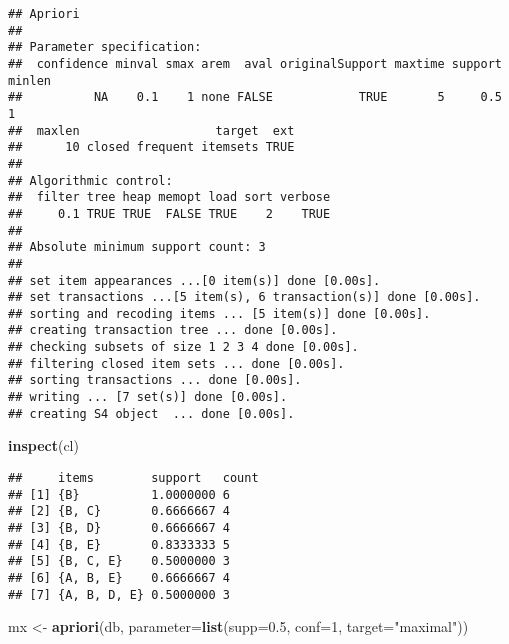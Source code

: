 \documentclass[
]{article}
\newenvironment{Shaded}{\begin{snugshade}}{\end{snugshade}}
\newcommand{\AttributeTok}[1]{\textcolor[rgb]{0.13,0.29,0.53}{#1}}
\newcommand{\DecValTok}[1]{\textcolor[rgb]{0.00,0.00,0.81}{#1}}
\newcommand{\FloatTok}[1]{\textcolor[rgb]{0.00,0.00,0.81}{#1}}
\newcommand{\FunctionTok}[1]{\textcolor[rgb]{0.13,0.29,0.53}{\textbf{#1}}}
\newcommand{\NormalTok}[1]{#1}
\newcommand{\OtherTok}[1]{\textcolor[rgb]{0.56,0.35,0.01}{#1}}
\newcommand{\StringTok}[1]{\textcolor[rgb]{0.31,0.60,0.02}{#1}}
\begin{document}
\begin{verbatim}
## Apriori
## 
## Parameter specification:
##  confidence minval smax arem  aval originalSupport maxtime support minlen
##          NA    0.1    1 none FALSE            TRUE       5     0.5      1
##  maxlen                   target  ext
##      10 closed frequent itemsets TRUE
## 
## Algorithmic control:
##  filter tree heap memopt load sort verbose
##     0.1 TRUE TRUE  FALSE TRUE    2    TRUE
## 
## Absolute minimum support count: 3 
## 
## set item appearances ...[0 item(s)] done [0.00s].
## set transactions ...[5 item(s), 6 transaction(s)] done [0.00s].
## sorting and recoding items ... [5 item(s)] done [0.00s].
## creating transaction tree ... done [0.00s].
## checking subsets of size 1 2 3 4 done [0.00s].
## filtering closed item sets ... done [0.00s].
## sorting transactions ... done [0.00s].
## writing ... [7 set(s)] done [0.00s].
## creating S4 object  ... done [0.00s].
\end{verbatim}

\begin{Shaded}
\begin{Highlighting}[]
\FunctionTok{inspect}\NormalTok{(cl)}
\end{Highlighting}
\end{Shaded}

\begin{verbatim}
##     items        support   count
## [1] {B}          1.0000000 6    
## [2] {B, C}       0.6666667 4    
## [3] {B, D}       0.6666667 4    
## [4] {B, E}       0.8333333 5    
## [5] {B, C, E}    0.5000000 3    
## [6] {A, B, E}    0.6666667 4    
## [7] {A, B, D, E} 0.5000000 3
\end{verbatim}

\begin{Shaded}
\begin{Highlighting}[]
\NormalTok{mx }\OtherTok{\textless{}{-}} \FunctionTok{apriori}\NormalTok{(db, }\AttributeTok{parameter=}\FunctionTok{list}\NormalTok{(}\AttributeTok{supp=}\FloatTok{0.5}\NormalTok{, }\AttributeTok{conf=}\DecValTok{1}\NormalTok{, }\AttributeTok{target=}\StringTok{"maximal"}\NormalTok{))}
\end{Highlighting}
\end{Shaded}
\end{document}
